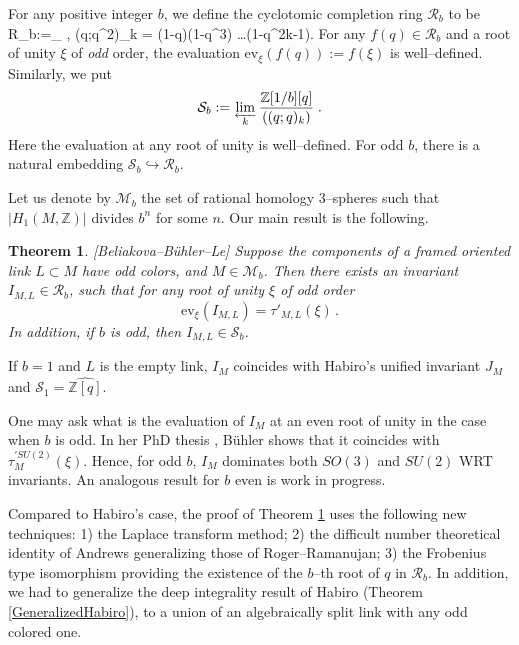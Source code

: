 \documentclass[12pt]{amsart}
\def\be#1\ee{\begin{equation}#1\end{equation}}
\theoremstyle{plain}
\newtheorem{Thm}{Theorem}
\theoremstyle{definition}
\def\BZ{\mathbb Z}
\def\cM{\mathcal M}
\def\M{\mathcal M}
\def\R{\mathcal R}
\def\calS{\mathcal S}
\def\Z{\BZ}
\def\ev{\mathrm{ev}}
\def\Habiro{\widehat{\Z[q]}}
\begin{document}
 For any positive integer $b$, we  define the
cyclotomic completion ring $\R_b$ to be
\be
\label{ab} \R_b:=\lim_{}
\frac{\Z[1/b][q]}{
\left((q;q^2)_k\right)}, \qquad {} \quad
(q;q^2)_k = (1-q)(1-q^3) \dots (1-q^{2k-1}).
\ee
For any    $f(q)\in \R_b$ and a root of unity $\xi$ of {\em odd} order,
the evaluation $\ev_\xi (f(q)):= f(\xi)$ is well--defined.
Similarly, we put
$$\calS_b :=\lim_{\overleftarrow{\hspace{2mm}k\hspace{2mm}}}
\frac{\Z[1/b][q]}
{((q;q)_k)}\; .$$
Here the evaluation at any root of unity is well--defined. For odd $b$,
there is  a natural embedding
$\calS_b\hookrightarrow \R_b$.



Let us denote by $\M_b$ the set of rational homology 3--spheres such that
$|H_1(M,\Z)|$ divides $b^n$ for some $n$.
Our main result is the following.
\begin{Thm}\label{main} {\rm [Beliakova--B\"uhler--Le]}
Suppose the components of a framed oriented link $L \subset M$ have odd colors, and $M\in \cM_b$. Then
there exists an invariant $I_{M,L} \in \R_b$,
such that for any root of unity $\xi$ of odd order
$$\ev_\xi(I_{M,L})=\tau'_{M,L}(\xi)\, .$$
In addition, if $b$ is odd, then
$I_{M,L}\in \calS_b$.
\end{Thm}

If $b=1$ and $L$ is the empty link, $I_{M}$
coincides with Habiro's unified invariant $J_M$ and
$\calS_1=\Habiro$.


One may ask what is the evaluation of $I_M$ at an even
root of unity in the case when $b$ is odd.
In her PhD thesis \cite{B}, B\"uhler shows that it
coincides with $\tau^{\prime SU(2)}_M(\xi)$.
Hence, for odd $b$, $I_M$ dominates both $SO(3)$ and $SU(2)$
WRT invariants. An analogous result for $b$ even is
work in progress.


Compared to  Habiro's case,
the proof of Theorem \ref{main} uses the following
new techniques:
1)  the Laplace transform method;
2) the difficult number theoretical identity of Andrews generalizing those of
Roger--Ramanujan;
3) the Frobenius type isomorphism providing the existence of the
$b$--th root of $q$ in $\R_b$.
In addition,  we had to generalize the deep integrality result of Habiro
(Theorem \ref{GeneralizedHabiro}),
  to a union of an algebraically split link
with any odd colored one.
\end{document}
